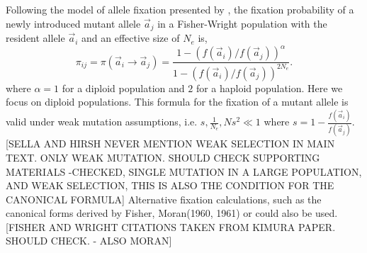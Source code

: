 \documentclass[13pt]{article}
\newcommand{\avec}{\ensuremath{\vec{a}}\xspace}
\begin{document}
Following the model of allele fixation presented by \citet{SellaAndHirsh05}, the fixation probability of a newly introduced mutant allele $\avec_j$ in a Fisher-Wright population with the resident allele $\avec_i$ and an effective size of $N_e$ is,
\begin{equation}
\pi_{ij} = \pi\left(\avec_i \to \avec_j \right) = \frac{1-\left(f\left(\avec_i\right)/f\left(\avec_j\right)\right)^\alpha}{1-\left(f\left(\avec_i\right)/f\left(\avec_j\right)\right)^{2N_e}}.
\label{eq:fixation}
\end{equation}
where $\alpha = 1$ for a diploid population and $2$ for a haploid population.
Here we focus on diploid populations.
This formula for the fixation of a mutant allele is valid under weak mutation assumptions, i.e. $s, \frac{1}{N_e}, Ns^2 \ll 1$ where $s=1-\frac{f(\avec_i)}{f(\avec_j)}$.[SELLA AND HIRSH NEVER MENTION WEAK SELECTION IN MAIN TEXT. ONLY WEAK MUTATION. SHOULD CHECK SUPPORTING MATERIALS -CHECKED, SINGLE MUTATION IN A LARGE POPULATION, AND WEAK SELECTION, THIS IS ALSO THE CONDITION FOR THE CANONICAL FORMULA] %
Alternative fixation calculations, such as the canonical forms derived by Fisher, Moran(1960, 1961) \citet{Fisher30, Wright31} or \citet{Kimura62} could also be used. [FISHER AND WRIGHT CITATIONS TAKEN FROM KIMURA PAPER. SHOULD CHECK. - ALSO MORAN] 

%
%
\end{document}

